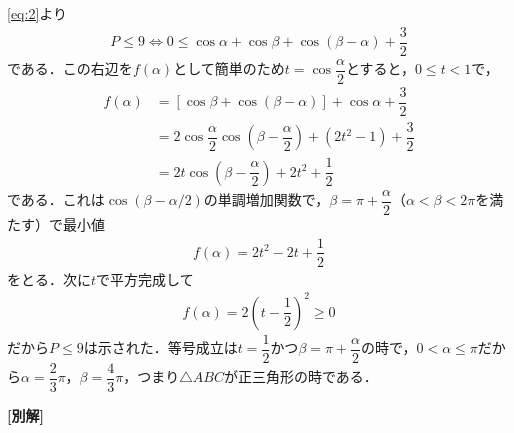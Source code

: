 \documentclass[../../main.tex]{subfiles}
\begin{document}
\cref{eq:2}より
\begin{align}
  P\le 9
  \iff
  0 \le \cos\alpha+\cos\beta+\cos(\beta-\alpha) + \dfrac{3}{2}
\end{align}
である．この右辺を$f(\alpha)$として簡単のため$t=\cos\dfrac{\alpha}{2}$とすると，$0\le t<1$で，
\begin{align}
  f(\alpha)
  &= \left[\cos\beta+\cos(\beta-\alpha)\right]  + \cos\alpha + \dfrac{3}{2}\\
  &= 2\cos\dfrac{\alpha}{2}\cos\left(\beta-\dfrac{\alpha}{2}\right) + (2t^2-1) + \dfrac{3}{2} \\
  &= 2t\cos\left(\beta-\dfrac{\alpha}{2}\right)+2t^2+\dfrac{1}{2}
\end{align}
である．これは$\cos(\beta-\alpha/2)$の単調増加関数で，$\beta=\pi+\dfrac{\alpha}{2}$（$\alpha<\beta<2\pi$を満たす）で最小値
\begin{align}
  f(\alpha)=2t^2-2t+\dfrac{1}{2}
\end{align}
をとる．次に$t$で平方完成して
\begin{align}
  f(\alpha)=2\left(t-\dfrac{1}{2}\right)^2 \ge 0
\end{align}
だから$P \le 9$は示された．等号成立は$t=\dfrac{1}{2}$かつ$\beta=\pi+\dfrac{\alpha}{2}$の時で，$0<\alpha\le\pi$だから$\alpha=\dfrac{2}{3}\pi$，$\beta=\dfrac{4}{3}\pi$，つまり$\triangle ABC$が正三角形の時である．

{\bf [別解]}
\end{document}
